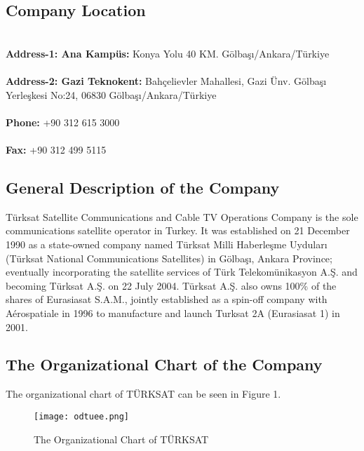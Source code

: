 \subsection{Company Location}
\-
\\
\textbf{ Address-1: Ana Kampüs:} Konya Yolu 40 KM. Gölbaşı/Ankara/Türkiye 
\\
\\
\textbf{ Address-2: Gazi Teknokent:} Bahçelievler Mahallesi, Gazi Ünv. Gölbaşı Yerleşkesi No:24, 06830 Gölbaşı/Ankara/Türkiye 
\\
\\
\textbf{ Phone:} +90 312 615 3000
\\
\\
\textbf{ Fax:} +90 312 499 5115



\subsection{General Description of the Company}
\*
\indent Türksat Satellite Communications and Cable TV Operations Company is the sole communications satellite operator in Turkey. It was established on 21 December 1990 as a state-owned company named Türksat Milli Haberleşme Uyduları (Türksat National Communications Satellites) in Gölbaşı, Ankara Province; eventually incorporating the satellite services of Türk Telekomünikasyon A.Ş. and becoming Türksat A.Ş. on 22 July 2004. Türksat A.Ş. also owns 100\% of the shares of Eurasiasat S.A.M., jointly established as a spin-off company with Aérospatiale in 1996 to manufacture and launch Turksat 2A (Eurasiasat 1) in 2001.
\subsection{The Organizational Chart of the Company}
\-
\indent
The organizational chart of TÜRKSAT can be seen in Figure 1.

\begin{figure}[H]
\centering
\texttt{[image: odtuee.png]}\\
\caption{\label{fig:cooling}The Organizational Chart of TÜRKSAT }
\end{figure}

